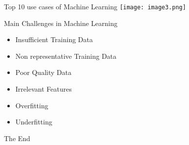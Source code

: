 \documentclass{beamer}
\begin{document}
\begin{frame}{Top 10 use cases of Machine Learning}
\texttt{[image: image3.png]}
\centering
\end{frame}

\begin{frame}{Main Challenges in Machine Learning}
\begin{itemize}
    \item Insufficient Training Data
    \item Non representative Training Data
    \item Poor Quality Data
    \item Irrelevant Features
    \item Overfitting
    \item Underfitting
\end{itemize}
\end{frame}
\begin{frame}
\huge{\centerline{The End}}
\end{frame}
\end{document}
